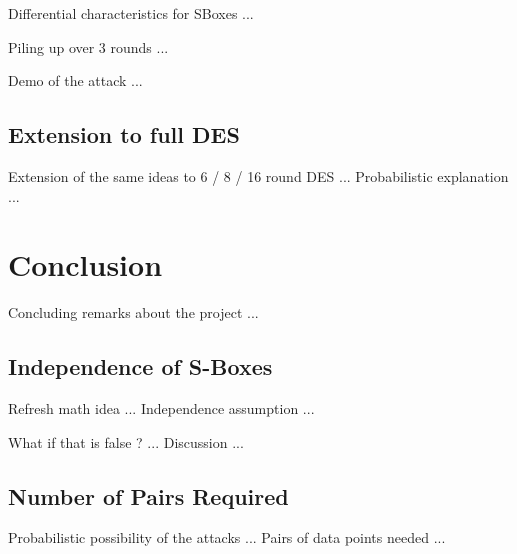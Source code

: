 \documentclass[9pt]{beamer}
\begin{document}
\begin{frame}
Differential characteristics for SBoxes ...

\end{frame}

\begin{frame}
Piling up over 3 rounds ...

\end{frame}

\begin{frame}
Demo of the attack ...

\end{frame}

\subsection{Extension to full DES}
\begin{frame}
Extension of the same ideas to 6 / 8 / 16 round DES ... Probabilistic explanation ...

\end{frame}


\section{Conclusion}
\begin{frame}
Concluding remarks about the project ...

\end{frame}

\subsection{Independence of S-Boxes}
\begin{frame}
Refresh math idea ... Independence assumption ... 

\end{frame}

\begin{frame}
What if that is false ? ... Discussion ...

\end{frame}

\subsection{Number of Pairs Required}
\begin{frame}
Probabilistic possibility of the attacks ... Pairs of data points needed ... 

\end{frame}
\end{document}
